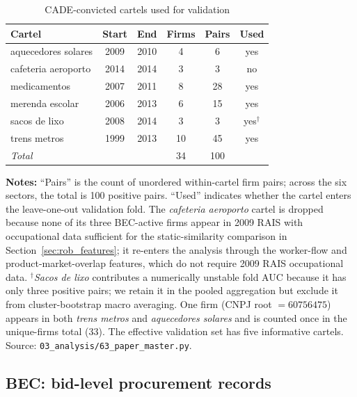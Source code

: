 \begin{table}[htbp]
\centering
\caption{CADE-convicted cartels used for validation}\label{tab:cade_cartels}
\small
\begin{tabular}{lccccc}
\toprule
Cartel & Start & End & Firms & Pairs & Used \\
\midrule
aquecedores solares  & 2009 & 2010 &  4 &  6 & yes \\
cafeteria aeroporto  & 2014 & 2014 &  3 &  3 & no \\
medicamentos         & 2007 & 2011 &  8 & 28 & yes \\
merenda escolar      & 2006 & 2013 &  6 & 15 & yes \\
sacos de lixo        & 2008 & 2014 &  3 &  3 & yes$^\dagger$ \\
trens metros         & 1999 & 2013 & 10 & 45 & yes \\
\midrule
\emph{Total}         &      &      & 34 & 100 & \\
\bottomrule
\end{tabular}
\vspace{0.5em}
\begin{minipage}{0.95\textwidth}
\scriptsize{\textbf{Notes:} ``Pairs'' is the count of unordered within-cartel firm pairs; across the six sectors, the total is 100 positive pairs. ``Used'' indicates whether the cartel enters the leave-one-out validation fold. The \emph{cafeteria aeroporto} cartel is dropped because none of its three BEC-active firms appear in 2009 RAIS with occupational data sufficient for the static-similarity comparison in Section~\ref{sec:rob_features}; it re-enters the analysis through the worker-flow and product-market-overlap features, which do not require 2009 RAIS occupational data. ${}^\dagger$\emph{Sacos de lixo} contributes a numerically unstable fold AUC because it has only three positive pairs; we retain it in the pooled aggregation but exclude it from cluster-bootstrap macro averaging. One firm (CNPJ root $= 60756475$) appears in both \emph{trens metros} and \emph{aquecedores solares} and is counted once in the unique-firms total (33). The effective validation set has five informative cartels. Source: \texttt{03\_analysis/63\_paper\_master.py}.\par}
\end{minipage}
\end{table}

\subsection{BEC: bid-level procurement records}\label{sec:data_bec}

